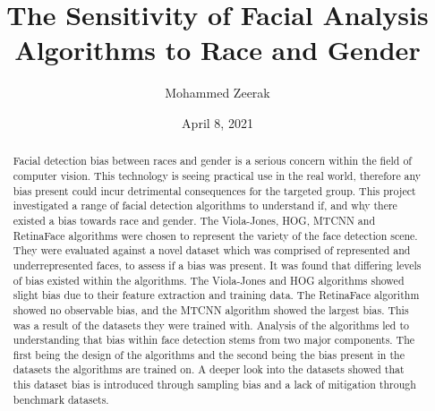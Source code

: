 \documentclass{l4proj}
\begin{document}
\title{The Sensitivity of Facial Analysis Algorithms to Race and Gender}
\author{Mohammed Zeerak}
\date{April 8, 2021}

\maketitle

\begin{abstract}
    
    Facial detection bias between races and gender is a serious concern within the field of computer vision. This technology is seeing practical use in the real world, therefore any bias present could incur detrimental consequences for the targeted group. This project investigated a range of facial detection algorithms to understand if, and why there existed a bias towards race and gender. The Viola-Jones, HOG, MTCNN and RetinaFace algorithms were chosen to represent the variety of the face detection scene. They were evaluated against a novel dataset which was comprised of represented and underrepresented faces, to assess if a bias was present. It was found that differing levels of bias existed within the algorithms. The Viola-Jones and HOG algorithms showed slight bias due to their feature extraction and training data. The RetinaFace algorithm showed no observable bias, and the MTCNN algorithm showed the largest bias. This was a result of the datasets they were trained with. Analysis of the algorithms led to understanding that bias within face detection stems from two major components. The first being the design of the algorithms and the second being the bias present in the datasets the algorithms are trained on. A deeper look into the datasets showed that this dataset bias is introduced through sampling bias and a lack of mitigation through benchmark datasets.
    
\end{abstract}
\end{document}
